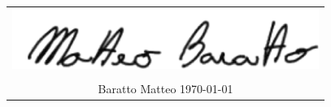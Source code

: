 \vspace*{\fill}
\hspace*{\fill}
\begin{tabular}{c}
    \vspace{-0.3cm}\includegraphics[scale=0.4]{media/signature.png} \\
    \hrulefill \\
    Baratto Matteo \hfill \today \\
\end{tabular}